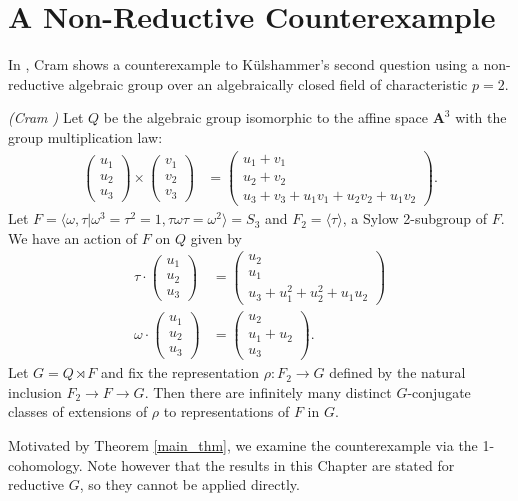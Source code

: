 \section{A Non-Reductive Counterexample}
In \cite[Appendix]{slodowy1997two}, Cram shows a counterexample to K\"ulshammer's second question using a non-reductive algebraic group over an algebraically closed field of characteristic $p=2$.
\begin{example}\emph{(Cram \cite[Appendix]{slodowy1997two})} Let $Q$ be the algebraic group isomorphic to the affine space $\mathbf{A}^3$ with the group multiplication law:
\begin{align*}
	\left(\begin{matrix} u_1 \\ u_2 \\ u_3 \end{matrix}\right) \times
	\left(\begin{matrix} v_1 \\ v_2 \\ v_3 \end{matrix}\right) &=
	\left(\begin{matrix} u_1 + v_1 \\ u_2 + v_2 \\ u_3 + v_3 + u_1v_1 + u_2v_2 + u_1v_2 \end{matrix}\right).
\end{align*}
Let $F = \langle \omega, \tau | \omega^3 = \tau^2 = 1, \tau\omega\tau = \omega^2 \rangle = S_3$ and $F_2 = \langle \tau \rangle$, a Sylow 2-subgroup of $F$. We have an action of $F$ on $Q$ given by
\begin{align*}
	\tau \cdot \left(\begin{matrix} u_1 \\ u_2 \\ u_3 \end{matrix} \right) &=
	\left(\begin{matrix} u_2 \\ u_1 \\ u_3 + u_1^2 + u_2^2 + u_1u_2 \end{matrix} \right) \\
	\omega \cdot \left(\begin{matrix} u_1 \\ u_2 \\ u_3 \end{matrix} \right) &=
	\left(\begin{matrix} u_2 \\ u_1 + u_2 \\ u_3 \end{matrix} \right).
\end{align*}
Let $G = Q \rtimes F$ and fix the representation $\rho:F_2 \rightarrow G$ defined by the natural inclusion $F_2 \rightarrow F \rightarrow G$. Then there are infinitely many distinct $G$-conjugate classes of extensions of $\rho$ to representations of $F$ in $G$.
\label{eg:non_red}
\end{example}
Motivated by Theorem \ref{main_thm}, we examine the counterexample via the 1-cohomology. Note however that the results in this Chapter are stated for reductive $G$, so they cannot be applied directly.

